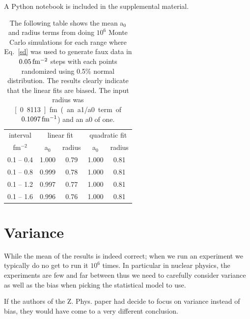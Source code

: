 \documentclass[10pt,aps,prc,twocolumn]{revtex4-1}
\begin{document}
A Python notebook is included in the supplemental material.

\begin{table}
\label{ztable}
\caption{The following table shows the mean a$_0$ and radius terms from doing $10^6$ Monte Carlo simulations
for each range
where Eq.~\ref{sd} was used to generate faux data in $\unit[0.05]{fm^{-2}}$ steps with each points randomized using
0.5\% normal distribution.   The results clearly indicate that the linear fits are biased.   The input
radius was \unit[0.8113]{fm} (an a1/a0 term of $\unit[0.1097]{fm^{-1}}$) and an a0 of one.}
\begin{tabular}{c|cc|cc} \hline
interval       & \multicolumn{2}{c|}{linear fit} & \multicolumn{2}{c}{quadratic fit}  \\
fm$^{-2}$      & a$_0$      & radius          & a$_0$    & radius \\ \hline
 0.1 -- 0.4 & 1.000& 0.79& 1.000& 0.81 \\
 0.1 -- 0.8 & 0.999& 0.78& 1.000& 0.81 \\
 0.1 -- 1.2 & 0.997& 0.77& 1.000& 0.81 \\
 0.1 -- 1.6 & 0.996& 0.76& 1.000& 0.81 \\ \hline
\end{tabular}
\end{table}

\section{Variance}

While the mean of the results is indeed correct; when we run an experiment we typically do no get to run it $10^6$ times.
In particular in nuclear physics, the experiments are few and far between thus we need to carefully consider variance as
well as the bias when picking the statistical model to use.

If the authors of the Z. Phys. paper had decide to focus on variance instead of bias, they would have come to a very
different conclusion.
\end{document}

